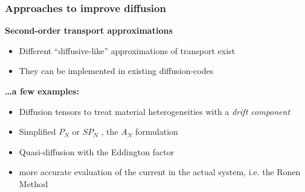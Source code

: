 \begin{frame}
  \frametitle{Approaches to improve diffusion}

  \begin{block}{\bf Second-order transport approximations}
    {\vspace{3mm}
    \begin{itemize} \Large
      \setlength{\itemsep}{5mm}
      \item Different ``diffusive-like'' approximations of transport exist
      \item They can be implemented in existing diffusion-codes
    \end{itemize}
    }
  \end{block}
  \vfill
  \begin{exampleblock}{\bf \ldots{a} few examples:}
  {\vspace{3mm}
  \begin{itemize} \large
    \setlength{\itemsep}{5mm}
    \item \textcolor{ceablue1}{Diffusion tensors} to treat material heterogeneities with a \emph{drift component} \cite{boffi1972tensorial}
    \item Simplified $P_N$ or \textcolor{ceablue1}{$SP_N$} \cite{gelbard1960application, brantley2000simplified}, the \textcolor{ceablue1}{$A_N$} formulation \cite{PieroSNandAN, coppa2016an}
    \item \textcolor{ceablue1}{Quasi-diffusion} with the Eddington factor \cite{pounders2009diffusion}
    \item more accurate evaluation of the current in the actual system, i.e. the \textcolor{ceablue1}{Ronen Method} \cite{ronen2004accurate}
  \end{itemize}
  }
  \end{exampleblock}
\end{frame}
